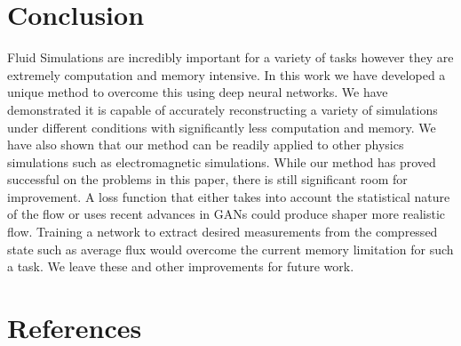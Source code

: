 \documentclass{article}
\begin{document}
\section{Conclusion}

Fluid Simulations are incredibly important for a variety of tasks however they are extremely computation and memory intensive. In this work we have developed a unique method to overcome this using deep neural networks. We have demonstrated it is capable of accurately reconstructing a variety of simulations under different conditions with significantly less computation and memory. We have also shown that our method can be readily applied to other physics simulations such as electromagnetic simulations. While our method has proved successful on the problems in this paper, there is still significant room for improvement. A loss function that either takes into account the statistical nature of the flow or uses recent advances in GANs could produce shaper more realistic flow. Training a network to extract desired measurements from the compressed state such as average flux would overcome the current memory limitation for such a task. We leave these and other improvements for future work.

\section*{References}



\end{document}
